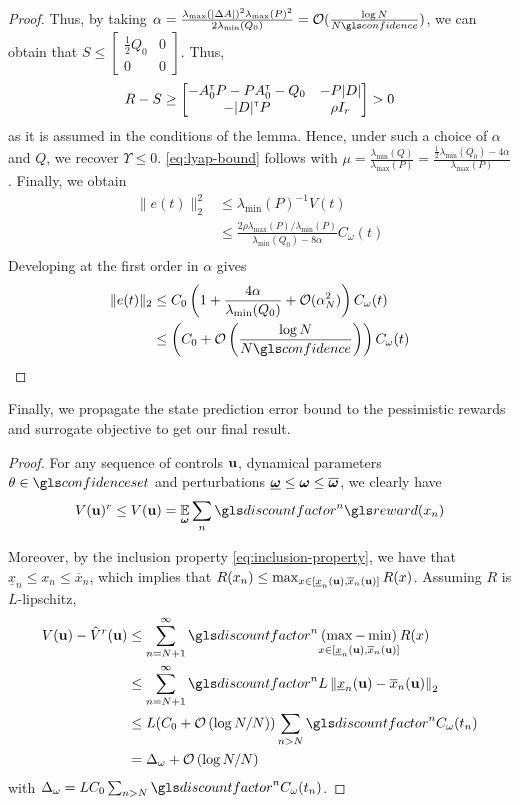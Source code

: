 \begin{subappendices}
\begin{proof}
		Thus, by taking $\alpha = \frac{\lambda_{\max}(|\Delta A|)^2\lambda_{\max}(P)^2}{2\lambda_{\min}(Q_0)} = \cO(\frac{\log N}{N\confidence})$, we can obtain that $S \leq \begin{bmatrix}
		\frac{1}{2}Q_0 & 0\\0 & 0
		\end{bmatrix}$. Thus,
		\[R-S \geq \begin{bmatrix}
		-A_0^{\mathsf{\scriptscriptstyle T}} P - P A_0^{\mathsf{\scriptscriptstyle T}} - Q_0 & -P|D|\\
		-|D|^{\mathsf{\scriptscriptstyle T}} P & \rho I_r\\
		\end{bmatrix} > 0 \]
		as it is assumed in the conditions of the lemma. Hence, under such a choice of $\alpha$ and $Q$, we recover $\Upsilon\leq 0$. \eqref{eq:lyap-bound} follows with $\mu = \frac{\lambda_{\min}(Q)}{\lambda_{\max}(P)} = \frac{\frac{1}{2}\lambda_{\min}(Q_0) - 4\alpha}{\lambda_{\max}(P)}$.
		Finally, we obtain
		\begin{align*}
		\|e(t)\|_2^2 &\leq \lambda_{\min}(P)^{-1} V(t)\\
		& \leq \frac{2\rho\lambda_{\max}(P)/\lambda_{\min}(P)}{\lambda_{\min}(Q_0) - 8\alpha} C_\omega(t)\\
		\end{align*}
		Developing at the first order in $\alpha$ gives
		\begin{align*}
		\|e(t)\|_2 &\leq C_0\left(1 + \frac{4\alpha}{\lambda_{\min}(Q_0)} + \cO(\alpha_N^2)\right)C_\omega(t)\\
		&\leq \left(C_0 + \cO\left(\frac{\log N}{N\confidence}\right)\right)C_\omega(t)
		\end{align*}
	\end{proof}
	
	
	Finally, we propagate the state prediction error bound to the pessimistic rewards and surrogate objective to get our final result.
	\begin{proof}
		For any sequence of controls $\mathbf{u}$, dynamical parameters $\theta\in \confidenceset$ and perturbations $\underline{\bm{\omega}} \leq \bm{\omega} \leq \overline{\bm{\omega}}$, we clearly have 
		\[V(\bu)^r \leq V(\bu) = \expectedvalue_{\bom}\sum_n \discount^n \R(x_n)\]
		
		Moreover, by the inclusion property \eqref{eq:inclusion-property}, we have that $\underline{x}_n \leq x_n \leq \overline{x}_n$, which implies that $R(x_n) \leq \max_{x\in[\underline{x}_n(\mathbf{u}), \overline{x}_n(\mathbf{u})]}  R(x)$. Assuming $R$ is $L$-lipschitz,
		\begin{align*}
		V(\bu) - \hat{V}^r(\bu) &\leq \sum_{n=N+1}^\infty \discount^n \underset{{x\in[\underline{x}_n(\bu), \overline{x}_n(\bu)]}}{(\max - \min)} R(x)\\
		&\leq \sum_{n=N+1}^\infty \discount^n L \left\|\underline{x}_n(\bu) - \overline{x}_n(\bu)\right\|_2\\
		&\leq L(C_0 + \cO\left({\log N / N}\right)) \sum_{n>N} \discount^n C_{\omega}(t_n)\\
		&= \Delta_\omega + \cO\left({\log N / N}\right)
		\end{align*}
		with $\Delta_\omega = L C_0\sum_{n>N} \discount^n C_{\omega}(t_n)$.
		

\end{proof}
\end{subappendices}
